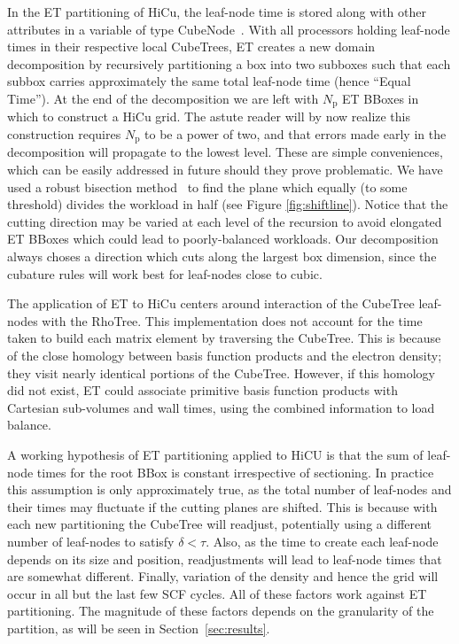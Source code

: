 \commentoutA{\documentclass[prl,aps,twocolumn,showpacs,twocolumngrid,superbib]{revtex4}}
\newcommand{\Np}{N_{\mathrm{p}}} \newcommand{\Nbox}{N_{\mathrm{b}}}
\begin{document}
In the ET partitioning of HiCu, the leaf-node time is stored along with other
attributes in a variable of type CubeNode~\cite{MChallacombe00A}.
With all processors holding leaf-node times in their respective local
CubeTrees, ET creates a new domain decomposition by recursively
partitioning a box into two subboxes such that each subbox carries
approximately the same total leaf-node time (hence ``Equal Time'').
At the end of the decomposition we are left with $\Np$ ET BBoxes in
which to construct a HiCu grid.  The astute reader will by now realize
this construction requires $\Np$ to be a power of two, and that errors
made early in the decomposition will propagate to the lowest level.
These are simple conveniences, which can be easily addressed in future
should they prove problematic.  We have used a robust bisection
method~\cite{WPress92} to find the plane which equally (to some
threshold) divides the workload in half (see Figure
\ref{fig:shiftline}). Notice that the cutting direction may be varied
at each level of the recursion to avoid elongated ET BBoxes which
could lead to poorly-balanced workloads. Our decomposition always
choses a direction which cuts along the largest box dimension, since
the cubature rules will work best for leaf-nodes close to cubic\cite{Stroud71}.

The application of ET to HiCu centers around interaction of the 
CubeTree leaf-nodes with the RhoTree.  This implementation does not account
for the time taken to build each matrix element by traversing the CubeTree.
This is because of the close homology between basis function products
and the electron density; they visit nearly identical portions of the
CubeTree.  However, if this homology did not exist, ET  could
associate primitive basis function products with Cartesian sub-volumes 
and wall times, using the combined information to load balance.

A working hypothesis of ET partitioning applied to HiCU is that the sum of 
leaf-node times for the root BBox is constant irrespective of sectioning.  In
practice this assumption is only approximately true, as the total number of leaf-nodes and
their times may fluctuate if the cutting planes are shifted. This is 
because with each new partitioning the CubeTree will
readjust, potentially using a different number of leaf-nodes to satisfy
$\delta<\tau$.  Also, as the time to create each leaf-node depends on
its size and position, readjustments will lead to leaf-node times that
are somewhat different. Finally, variation of the density and hence
the grid will occur in all but the last few SCF cycles.  All of these
factors work against ET partitioning.  The magnitude of these factors
depends on the granularity of the partition, as will be seen in 
Section~\ref{sec:results}.
\end{document}
